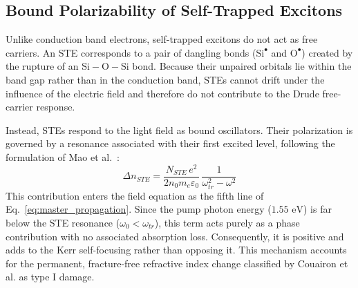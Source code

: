 \subsection{Bound Polarizability of Self-Trapped Excitons}
Unlike conduction band electrons, self-trapped excitons do not act as free carriers. An STE corresponds to a pair of dangling bonds ($\text{Si}^\bullet$ and $\text{O}^\bullet$) created by the rupture of an $\text{Si}-\text{O}-\text{Si}$ bond. Because their unpaired orbitals lie within the band gap rather than in the conduction band, STEs cannot drift under the influence of the electric field and therefore do not contribute to the Drude free-carrier response. 

Instead, STEs respond to the light field as bound oscillators. Their polarization is governed by a resonance associated with their first excited level, following the formulation of Mao et al.~\cite{mao2004}:
\begin{equation}
\Delta n_{STE} = \frac{N_{STE} \, e^2}{2n_0m_e \varepsilon_0} \, \frac{1}{\omega_{tr}^2 - \omega^2}
\end{equation}
This contribution enters the field equation as the fifth line of Eq.~\eqref{eq:master_propagation}. Since the pump photon energy ($1.55\text{ eV}$) is far below the STE resonance ($\omega_0 < \omega_{tr}$), this term acts purely as a phase contribution with no associated absorption loss. Consequently, it is positive and adds to the Kerr self-focusing rather than opposing it. This mechanism accounts for the permanent, fracture-free refractive index change classified by Couairon et al. as type I damage.

